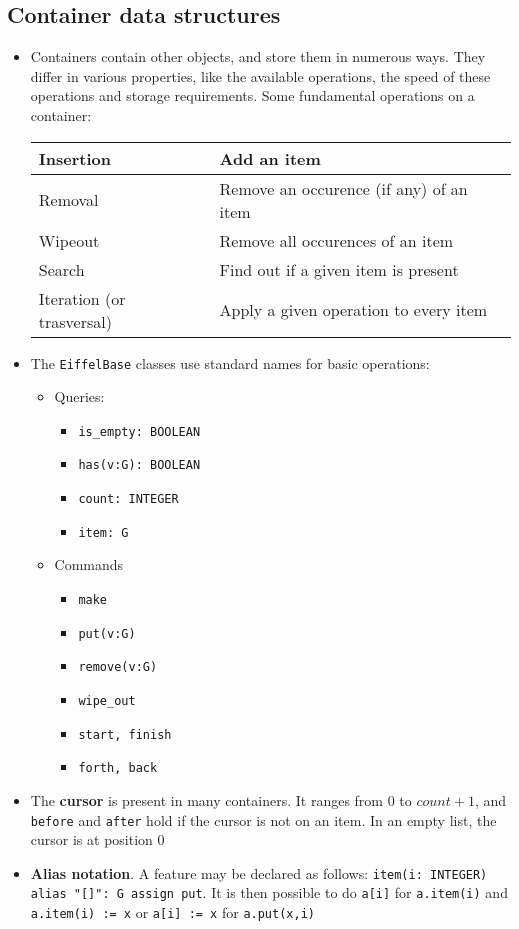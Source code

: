 \documentclass[a4paper]{article}
\newcommand{\inline}[1]{\lstinline!#1!}%
\begin{document}
\subsection{Container data structures}
\begin{itemize}
\item Containers contain other objects, and store them in numerous ways. They differ in various properties, like the available operations, the speed of these operations and storage requirements. Some fundamental operations on a container:\\
\begin{center}
\begin{tabular}{|l|l|}
\hline
Insertion & Add an item\\\hline
Removal & Remove an occurence (if any) of an item\\\hline
Wipeout & Remove all occurences of an item\\\hline
Search & Find out if a given item is present \\\hline
Iteration (or trasversal) & Apply a given operation to every item\\\hline
\end{tabular}
\end{center}
\item The \inline{EiffelBase} classes use standard names for basic operations:
\begin{itemize}
\item Queries:
\begin{itemize}
\item \inline{is_empty: BOOLEAN}
\item\inline{has(v:G): BOOLEAN}
\item \inline{count: INTEGER}
\item \inline{item: G}
\end{itemize}
\item Commands
\begin{itemize}
\item \inline{make}
\item \inline{put(v:G)}
\item\inline{remove(v:G)}
\item\inline{wipe_out}
\item\inline{start, finish}
\item\inline{forth, back}
\end{itemize}
\end{itemize}
\item The \textbf{cursor} is present in many containers. It ranges from $0$ to $count+1$, and \inline{before} and \inline{after} hold if the cursor is not on an item. In an empty list, the cursor is at position $0$
\item \textbf{Alias notation}. A feature may be declared as follows: \inline{item(i: INTEGER) alias "[]": G assign put}. It is then possible to do \inline{a[i]} for \inline{a.item(i)} and \inline{a.item(i) := x} or \inline{a[i] := x} for \inline{a.put(x,i)}
\end{itemize}
\end{document}
